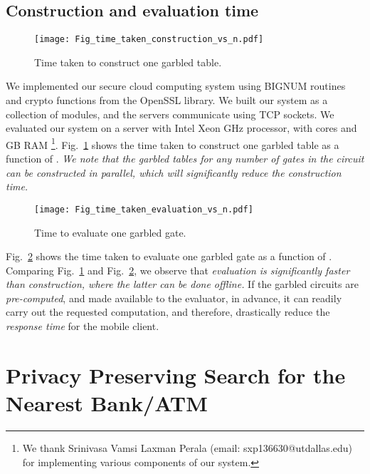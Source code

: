 \documentclass[10pt,journal,cspaper,compsoc]{IEEEtran}
\begin{document}
\subsection{Construction and evaluation time}

\begin{figure}[t]
\centering
\texttt{[image: Fig\_time\_taken\_construction\_vs\_n.pdf]}
\vspace{-3 mm}
\caption{Time taken to construct one garbled table.\vspace{-2 mm}}
\label{fig_time_construction}
\end{figure}

We implemented our secure cloud computing system using BIGNUM routines and crypto functions from the OpenSSL library. We built our system as a collection of modules, and the servers communicate using TCP sockets. We evaluated our system on a server with Intel Xeon  GHz processor, with  cores and  GB RAM \footnote{We thank Srinivasa Vamsi Laxman Perala (email: sxp136630@utdallas.edu) for implementing various components of our system.}. Fig.~\ref{fig_time_construction} shows the time taken to construct one garbled table as a function of . {\em We note that the garbled tables for any number of gates in the circuit can be constructed in parallel, which will significantly reduce the construction time.}

\begin{figure}[t]
\centering
\texttt{[image: Fig\_time\_taken\_evaluation\_vs\_n.pdf]}
\vspace{-3 mm}
\caption{Time to evaluate one garbled gate.\vspace{-3 mm}}
\label{fig_time_evaluation}
\end{figure}

Fig.~\ref{fig_time_evaluation} shows the time taken to evaluate one garbled gate as a function of . Comparing Fig.~\ref{fig_time_construction} and Fig.~\ref{fig_time_evaluation}, we observe that {\em evaluation is significantly faster than construction, where the latter can be done offline.} If the garbled circuits are {\em pre-computed}, and made available to the evaluator, in advance, it can readily carry out the requested computation, and therefore, drastically reduce the {\em response time} for the mobile client.





 \section{Privacy Preserving Search for the Nearest Bank/ATM}
\label{sec_manhattan_distance}
\end{document}
